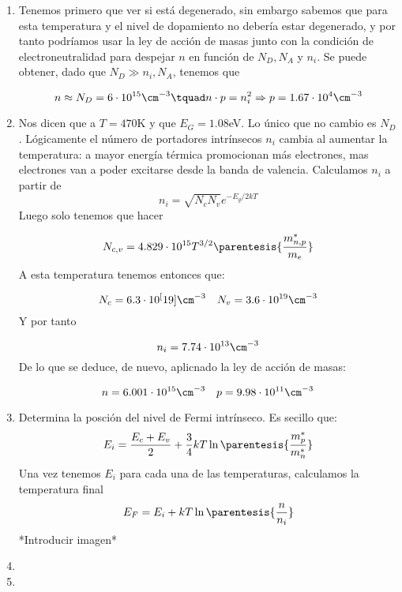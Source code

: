 	\begin{enumerate}[label=\alph*)]	
		\item Tenemos primero que ver si está degenerado, sin embargo sabemos que para esta temperatura y el nivel de dopamiento no debería estar degenerado, y por tanto podríamos usar la ley de acción de masas junto con la condición de electroneutralidad para despejar $n$ en función de $N_D,N_A$ y $n_i$. Se puede obtener, dado que $N_D \gg n_i,N_A$, tenemos que

		\begin{equation}
			n\approx N_D = 6\cdot 10^{15} \cm^{-3} \tquad n\cdot p = n_i^2 \Rightarrow p = 1.67 \cdot 10^4 \cm^{-3}
		\end{equation}
		\item Nos dicen que a $T=470$K y que $E_G=1.08$eV. Lo único que no cambio es $N_D$. Lógicamente el número de portadores intrínsecos $n_i$ cambia al aumentar la temperatura: a mayor energía térmica promocionan más electrones, mas electrones van a poder excitarse desde la banda de valencia. Calculamos $n_i$ a partir de
		\begin{equation}
			n_i = \sqrt{N_cN_v} e^{-E_g/2kT}
		\end{equation}
		Luego solo tenemos que hacer

		\begin{equation}
			N_{c,v} = 4.829\cdot 10^{15} T^{3/2} \parentesis{\frac{m_{n,p}^*}{m_e}}
		\end{equation}
		A esta temperatura tenemos entonces que:

		\begin{equation}
			N_c = 6.3 \cdot 10^[19] \cm^{-3} \quad N_v = 3.6 \cdot 10^{19} \cm^{-3}
		\end{equation}
		Y por tanto

		\begin{equation}
			n_i = 7.74 \cdot 10^{13} \cm^{-3}
		\end{equation}
		De lo que se deduce, de nuevo, aplicnado la ley de acción de masas:

		\begin{equation}
			n=6.001 \cdot 10^{15} \cm^{-3} \quad p = 9.98 \cdot 10^{11} \cm^{-3}
		\end{equation}
		\item Determina la posción del nivel de Fermi intrínseco. Es secillo que:
		\begin{equation}
			E_i = \frac{E_c + E_v}{2} + \frac{3}{4} kT \ln \parentesis{\frac{m_p^*}{m_n^*}}
		\end{equation}
		Una vez tenemos $E_i$ para cada una de las temperaturas, calculamos la temperatura final
		\begin{equation}
			E_F = E_i + kT \ln \parentesis{\frac{n}{n_i}}
		\end{equation}
		*Introducir imagen*
		\item
		\item
\end{enumerate}


	
